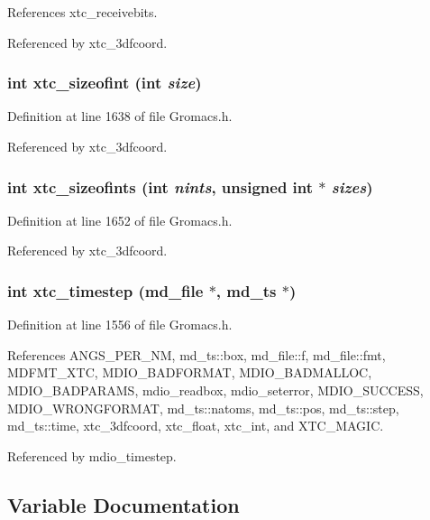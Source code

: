 References xtc\_\-receivebits.

Referenced by xtc\_\-3dfcoord.
\subsubsection{\setlength{\rightskip}{0pt plus 5cm}int xtc\_\-sizeofint (int {\em size})\hspace{0.3cm}{\tt  [static]}}\label{Gromacs_8h_a70}




Definition at line 1638 of file Gromacs.h.

Referenced by xtc\_\-3dfcoord.
\subsubsection{\setlength{\rightskip}{0pt plus 5cm}int xtc\_\-sizeofints (int {\em nints}, unsigned int $\ast$ {\em sizes})\hspace{0.3cm}{\tt  [static]}}\label{Gromacs_8h_a71}




Definition at line 1652 of file Gromacs.h.

Referenced by xtc\_\-3dfcoord.
\subsubsection{\setlength{\rightskip}{0pt plus 5cm}int xtc\_\-timestep ({\bf md\_\-file} $\ast$, {\bf md\_\-ts} $\ast$)\hspace{0.3cm}{\tt  [static]}}\label{Gromacs_8h_a55}




Definition at line 1556 of file Gromacs.h.

References ANGS\_\-PER\_\-NM, md\_\-ts::box, md\_\-file::f, md\_\-file::fmt, MDFMT\_\-XTC, MDIO\_\-BADFORMAT, MDIO\_\-BADMALLOC, MDIO\_\-BADPARAMS, mdio\_\-readbox, mdio\_\-seterror, MDIO\_\-SUCCESS, MDIO\_\-WRONGFORMAT, md\_\-ts::natoms, md\_\-ts::pos, md\_\-ts::step, md\_\-ts::time, xtc\_\-3dfcoord, xtc\_\-float, xtc\_\-int, and XTC\_\-MAGIC.

Referenced by mdio\_\-timestep.

\subsection{Variable Documentation}

